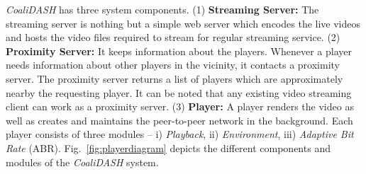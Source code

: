 \textit{CoaliDASH} has three system components. (1) {\bf Streaming Server:} The streaming server is nothing but a simple web server which encodes the live videos and hosts the video files required to stream for regular streaming service.
(2) {\bf Proximity Server:} It keeps information about the players. Whenever a player needs information about other players in the vicinity, it contacts a proximity server. The proximity server returns a list of players which are approximately nearby the requesting player.
It can be noted that any existing video streaming client can work as a proximity server. 
(3) {\bf Player:} A player renders the video as well as creates and maintains the peer-to-peer network in the background. Each player consists of three modules -- i) \textit{Playback}, ii) \textit{Environment}, iii) \textit{Adaptive Bit Rate} (ABR). Fig.~\ref{fig:playerdiagram} depicts the different components and modules of the \textit{CoaliDASH} system.

